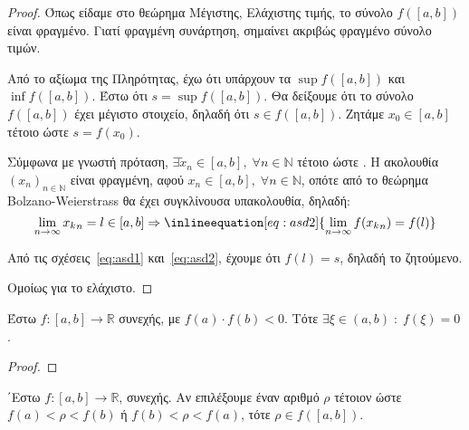 \documentclass[main.tex]{subfiles}
\begin{document}
        \begin{proof}
            Όπως είδαμε στο θεώρημα Μέγιστης, Ελάχιστης τιμής, το σύνολο $ f([a,b]) $ είναι 
            φραγμένο. Γιατί φραγμένη συνάρτηση, σημαίνει ακριβώς φραγμένο σύνολο τιμών. 

            Από το αξίωμα της Πληρότητας, έχω ότι υπάρχουν τα $ \sup f([a,b]) $ και 
            $ \inf f([a,b]) $. Έστω ότι $ s = \sup f([a,b]) $. Θα δείξουμε ότι το σύνολο 
            $ f([a,b]) $ έχει μέγιστο στοιχείο, δηλαδή ότι $ s \in f([a,b]) $. Ζητάμε 
            $ x_{0} \in [a,b] $ τέτοιο ώστε $ s = f(x_{0}) $.

            Σύμφωνα με γνωστή πρόταση, $ \exists \tilde{x}_{n} \in [a,b], \; 
            \forall n \in \mathbb{N} $ τέτοιο ώστε 
            . 
            Η ακολουθία $ (x_{n})_{n \in \mathbb{N}} $ είναι φραγμένη, αφού $ x_{n} \in [a,b], 
            \; \forall n \in \mathbb{N} $, οπότε από το θεώρημα Bolzano-Weierstrass θα έχει 
            συγκλίνουσα υπακολουθία, δηλαδή:
            \[
                \lim_{n \to \infty} {x_{k}}_{n} = l \in [a,b] \Rightarrow 
                \inlineequation[eq:asd2]{\lim_{n \to \infty} f({x_{k}}_{n}) = f(l)}
            \]

            Από τις σχέσεις~\eqref{eq:asd1} και~\eqref{eq:asd2}, έχουμε ότι $ f(l) =s $, 
            δηλαδή το ζητούμενο.

            Ομοίως για το ελάχιστο.
        \end{proof}

        \begin{thm}[Bolzano]
            Έστω $ f \colon [a,b] \to \mathbb{R} $ συνεχής, με $ f(a) \cdot f(b) <0 $. 
            Τότε $ \exists \xi \in (a,b) \; : \; f(\xi) = 0 $.
        \end{thm}

        \begin{proof}
        \end{proof}

        \begin{thm}
            ΄Εστω $ f \colon [a,b] \to \mathbb{R} $, συνεχής. Αν επιλέξουμε έναν αριθμό 
            $ \rho $ τέτοιον ώστε $ f(a) < \rho < f(b) $ ή $ f(b) < \rho < f(a) $, τότε 
            $ \rho \in f([a,b]) $.
        \end{thm}
\end{document}
